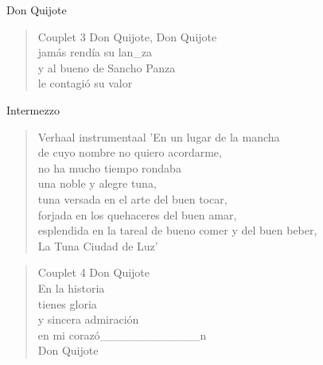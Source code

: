 \begin{song}{Don Quijote}
\begin{verse}{Couplet 3}
Don Quijote, Don Quijote\\
jamás rendía su lan\_za\\
y al bueno de Sancho Panza\\
le contagió su valor
\end{verse}

\clearpage
\begin{instrumental}{Intermezzo}
\measure{}\measure{}\measure{}\measure{}\measure{}\measure{}\measure{}\measure{}\measure{}\measure{}\measure{}\measure{}\measure{}\measure{}\measure{}\measure{}
\end{instrumental}

\begin{verse}{Verhaal instrumentaal}
'En un lugar de la mancha\\
de cuyo nombre no quiero acordarme,\\
no ha mucho tiempo rondaba\\
una noble y alegre tuna,\\
tuna versada en el arte del buen tocar,\\
forjada en los quehaceres del buen amar,\\
esplendida en la tareal de bueno comer y del buen beber,\\
La Tuna Ciudad de Luz'
\end{verse}


\begin{verse}{Couplet 4}
Don Quijote \\
En la historia\\
tienes gloria\\
y sincera admiración\hspace{1em}\\
en mi corazó\_\_\_\_\_\_\_\_\_\_\_\_n\\
Don Quijote  
\end{verse}
\end{song}
